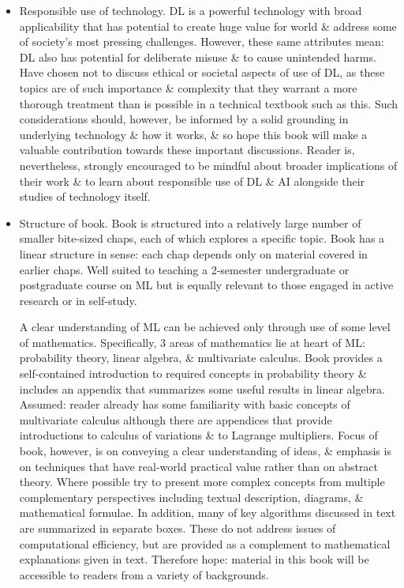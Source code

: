 \documentclass{article}
\begin{document}
\begin{enumerate}
\begin{itemize}
		\item {\sf Responsible use of technology.} DL is a powerful technology with broad applicability that has potential to create huge value for world \& address some of society's most pressing challenges. However, these same attributes mean: DL also has potential for deliberate misuse \& to cause unintended harms. Have chosen not to discuss ethical or societal aspects of use of DL, as these topics are of such importance \& complexity that they warrant a more thorough treatment than is possible in a technical textbook such as this. Such considerations should, however, be informed by a solid grounding in underlying technology \& how it works, \& so hope this book will make a valuable contribution towards these important discussions. Reader is, nevertheless, strongly encouraged to be mindful about broader implications of their work \& to learn about responsible use of DL \& AI alongside their studies of technology itself.
		\item {\sf Structure of book.} Book is structured into a relatively large number of smaller bite-sized chaps, each of which explores a specific topic. Book has a linear structure in sense: each chap depends only on material covered in earlier chaps. Well suited to teaching a 2-semester undergraduate or postgraduate course on ML but is equally relevant to those engaged in active research or in self-study.
		
		A clear understanding of ML can be achieved only through use of some level of mathematics. Specifically, 3 areas of mathematics lie at heart of ML: probability theory, linear algebra, \& multivariate calculus. Book provides a self-contained introduction to required concepts in probability theory \& includes an appendix that summarizes some useful results in linear algebra. Assumed: reader already has some familiarity with basic concepts of multivariate calculus although there are appendices that provide introductions to calculus of variations \& to Lagrange multipliers. Focus of book, however, is on conveying a clear understanding of ideas, \& emphasis is on techniques that have real-world practical value rather than on abstract theory. Where possible try to present more complex concepts from multiple complementary perspectives including textual description, diagrams, \& mathematical formulae. In addition, many of key algorithms discussed in text are summarized in separate boxes. These do not address issues of computational efficiency, but are provided as a complement to mathematical explanations given in text. Therefore hope: material in this book will be accessible to readers from a variety of backgrounds.
		

\end{itemize}
\end{enumerate}
\end{document}
